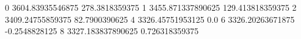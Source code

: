0 3604.83935546875 278.3818359375
1 3455.871337890625 129.413818359375
2 3409.24755859375 82.7900390625
4 3326.45751953125 0.0
6 3326.20263671875 -0.2548828125
8 3327.183837890625 0.726318359375
